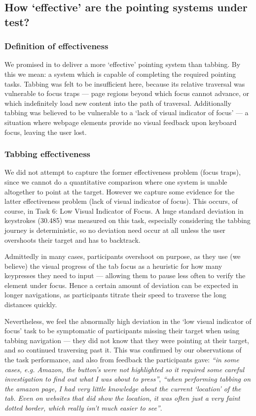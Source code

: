 \documentclass[11pt,openright,a4paper]{report}
\begin{document}
\subsection{How `effective' are the pointing systems under test?}
\subsubsection{Definition of effectiveness}
We promised in  to deliver a more `effective' pointing system than tabbing. By this we mean: a system which is capable of completing the required pointing tasks. Tabbing was felt to be insufficient here, because its relative traversal was vulnerable to focus traps --- page regions beyond which focus cannot advance, or which indefinitely load new content into the path of traversal. Additionally tabbing was believed to be vulnerable to a `lack of visual indicator of focus' --- a situation where webpage elements provide no visual feedback upon keyboard focus, leaving the user lost.

\subsubsection{Tabbing effectiveness}
\label{sec:tabbing_effectiveness}
We did not attempt to capture the former effectiveness problem (focus traps), since we cannot do a quantitative comparison where one system is unable altogether to point at the target. However we capture some evidence for the latter effectiveness problem (lack of visual indicator of focus). This occurs, of course, in Task 6: Low Visual Indicator of Focus. A huge standard deviation in keystrokes (30.485) was measured on this task, especially considering the tabbing journey is deterministic, so no deviation need occur at all unless the user overshoots their target and has to backtrack.

Admittedly in many cases, participants overshoot on purpose, as they use (we believe) the visual progress of the tab focus as a heuristic for how many keypresses they need to input --- allowing them to pause less often to verify the element under focus. Hence a certain amount of deviation can be expected in longer navigations, as participants titrate their speed to traverse the long distances quickly.

Nevertheless, we feel the abnormally high deviation in the `low visual indicator of focus' task to be symptomatic of participants missing their target when using tabbing navigation --- they did not know that they were pointing at their target, and so continued traversing past it. This was confirmed by our observations of the task performance, and also from feedback the participants gave: \textit{``in some cases, e.g. Amazon, the button's were not highlighted so it required some careful investigation to find out what I was about to press''}, \textit{``when performing tabbing on the amazon page, I had very little knowledge about the current `location' of the tab. Even on websites that did show the location, it was often just a very faint dotted border, which really isn't much easier to see''}.
\end{document}
